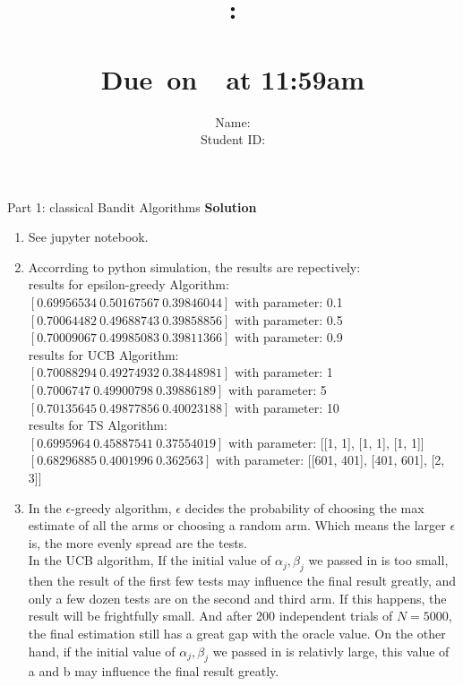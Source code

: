 \documentclass{article}
\title{
    \vspace{2in}
    \textmd{\textbf{\hmwkClass:\\  \hmwkTitle}}\\
    \normalsize\vspace{0.1in}\small{Due\ on\ \hmwkDueDate\ at 11:59am}\\
   \vspace{2in}
}
\author{
	Name: \textbf{\hmwkAuthorName} \\
	Student ID: \hmwkAuthorID}
\date{}
\newcommand{\solution}{\textbf{\Large Solution}}
\begin{document}
\maketitle
\pagebreak

\begin{homeworkProblem}{Part 1: classical Bandit Algorithms}
    \solution
    \begin{enumerate}
        \item[1,2.]
        See jupyter notebook.
        \item[3.]
        Accorrding to python simulation, the results are repectively:\\
        results for epsilon-greedy Algorithm:\\
        $[0.69956534\ 0.50167567\ 0.39846044]$ with parameter: 0.1\\
        $[0.70064482\ 0.49688743\ 0.39858856]$ with parameter: 0.5\\
        $[0.70009067\ 0.49985083\ 0.39811366]$ with parameter: 0.9\\
        results for UCB Algorithm:\\
        $[0.70088294\ 0.49274932\ 0.38448981]$ with parameter: 1\\
        $[0.7006747\ 0.49900798\ 0.39886189]$ with parameter: 5\\
        $[0.70135645\ 0.49877856\ 0.40023188]$ with parameter: 10\\
        results for TS Algorithm:\\
        $[0.6995964\ 0.45887541\ 0.37554019]$ with parameter: [[1, 1], [1, 1], [1, 1]]\\
        $[0.68296885\ 0.4001996\ 0.362563]$ with parameter: [[601, 401], [401, 601], [2, 3]]
        \item[4.]
        In the $\epsilon$-greedy algorithm, $\epsilon$ decides the probability of choosing the max estimate of all the arms or choosing a random arm.
        Which means the larger $\epsilon$ is, the more evenly spread are the tests.\\
        In the UCB algorithm, 
        If the initial value of $\alpha_j,\beta_j$ we passed in is too small,
        then the result of the first few tests may influence the final result greatly,
        and  only a few dozen tests are on the second and third arm. If this happens, the result will be frightfully small.
        And after 200 independent trials of $N = 5000$, the final estimation still has a great gap with the oracle value.
        On the other hand, if the initial value of $\alpha_j,\beta_j$ we passed in is relativly large, this value of a and b may influence the final result greatly.

\end{enumerate}
\end{homeworkProblem}
\end{document}
